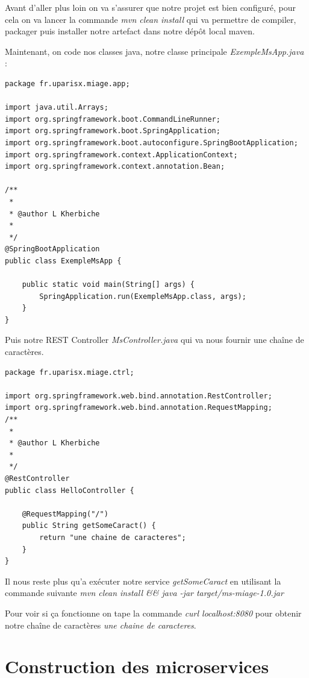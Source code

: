 \documentclass[12pt, a4paper, openany]{report}
\begin{document}
\begin{appendices}
 Avant d'aller plus loin on va s'assurer que notre projet est bien configuré, pour cela on va lancer la commande  \textit{mvn clean install} qui va permettre de compiler, packager puis installer notre artefact dans notre dépôt local maven.
 
 Maintenant, on code nos classes java, notre classe principale \textit{ExempleMsApp.java} :
 
\begin{lstlisting}
package fr.uparisx.miage.app;

import java.util.Arrays;
import org.springframework.boot.CommandLineRunner;
import org.springframework.boot.SpringApplication;
import org.springframework.boot.autoconfigure.SpringBootApplication;
import org.springframework.context.ApplicationContext;
import org.springframework.context.annotation.Bean;

/**
 * 
 * @author L Kherbiche
 *
 */
@SpringBootApplication
public class ExempleMsApp {

    public static void main(String[] args) {
        SpringApplication.run(ExempleMsApp.class, args);
    }
}
\end{lstlisting}

 Puis notre REST Controller \textit{MsController.java} qui va nous fournir une chaîne de caractères.
\begin{lstlisting}
package fr.uparisx.miage.ctrl;

import org.springframework.web.bind.annotation.RestController;
import org.springframework.web.bind.annotation.RequestMapping;
/**
 * 
 * @author L Kherbiche
 *
 */
@RestController
public class HelloController {

    @RequestMapping("/")
    public String getSomeCaract() {
        return "une chaine de caracteres";
    }
}
\end{lstlisting}
 
 Il nous reste plus qu'a exécuter notre service \textit{getSomeCaract} en utilisant la commande suivante 
 \textit{mvn clean install \&\& java -jar target/ms-miage-1.0.jar}
 
 Pour voir si ça fonctionne on tape la commande \textit{curl localhost:8080} pour obtenir notre chaîne de caractères 
\textit{une chaine de caracteres}.


\chapter{Construction des microservices} %
 

\end{appendices}
\end{document}
